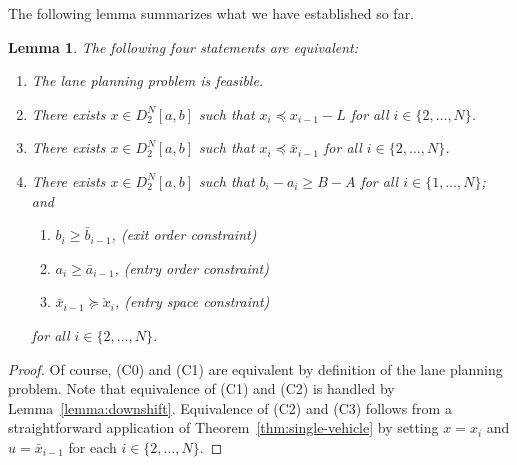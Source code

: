 \documentclass[a4paper]{report}
\theoremstyle{definition}
\theoremstyle{plain}
\newtheorem{lemma}{Lemma}[chapter]
\begin{document}
%
The following lemma summarizes what we have established so far.

\begin{lemma}\label{lemma:summary}
  The following four statements are equivalent:

  \begin{enumerate}[leftmargin=3em]
    \item[(C0)] The lane planning problem is feasible.
    \item[(C1)] There exists $x \in D_{2}^{N}[a, b]$ such that $x_{i} \preceq x_{i-1} - L$ for all $i \in \{2, \dots, N\}$.
    \item[(C2)] There exists $x \in D_{2}^{N}[a, b]$ such that $x_{i} \preceq \bar{x}_{i-1}$ for all $i \in \{2, \dots, N\}$.

    \item[(C3)] There exists $x \in D_{2}^{N}[a, b]$ such that
          $b_{i} - a_{i} \geq B - A$ for all $i \in \{1, \dots, N\}$; and
    \TabPositions{2cm}
    \begin{enumerate}[label=(\roman*)\quad,leftmargin=3em,midpenalty=10]
      \item $b_{i} \geq \bar{b}_{i-1}$, \tab (exit order constraint)
      \item $a_{i} \geq \bar{a}_{i-1}$, \tab (entry order constraint)
      \item $\bar{x}_{i-1} \succeq \check{x}_{i}$, \tab (entry space constraint)
    \end{enumerate}
    for all $i \in \{2, \dots, N\}$.

  \end{enumerate}
\end{lemma}
\begin{proof}
  Of course, (C0) and (C1) are equivalent by definition of the lane planning
  problem. Note that equivalence of (C1) and (C2) is handled by Lemma~\ref{lemma:downshift}.
  Equivalence of (C2) and (C3) follows from a straightforward application of
  Theorem~\ref{thm:single-vehicle} by setting $x=x_i$ and $u=\bar{x}_{i-1}$ for
  each $i \in \{2, \dots, N\}$.
\end{proof}
\end{document}

